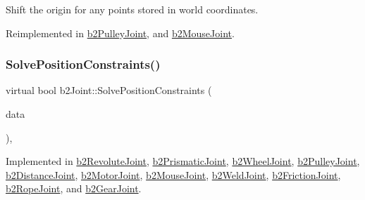 Shift the origin for any points stored in world coordinates. 



Reimplemented in \mbox{\hyperlink{classb2_pulley_joint_a5a9e626c758380fe565837bedb3dc018}{b2\+Pulley\+Joint}}, and \mbox{\hyperlink{classb2_mouse_joint_a9b1b2671837495be175e496afb622904}{b2\+Mouse\+Joint}}.

\mbox{\label{classb2_joint_af767ac9aa494bd15cdf83dfe3e487d9c}} 
\subsubsection{\texorpdfstring{SolvePositionConstraints()}{SolvePositionConstraints()}}
{\footnotesize\ttfamily virtual bool b2\+Joint\+::\+Solve\+Position\+Constraints (\begin{DoxyParamCaption}\item[{const \mbox{\hyperlink{structb2_solver_data}{b2\+Solver\+Data}} \&}]{data }\end{DoxyParamCaption})\hspace{0.3cm}{\ttfamily [protected]}, {}}



Implemented in \mbox{\hyperlink{classb2_revolute_joint_a01cab9d9609926a6debcd457bb8068f2}{b2\+Revolute\+Joint}}, \mbox{\hyperlink{classb2_prismatic_joint_ac841608a56e83f709e08b805ed8c92e3}{b2\+Prismatic\+Joint}}, \mbox{\hyperlink{classb2_wheel_joint_addbe70ee831954312bc31dee1d52311f}{b2\+Wheel\+Joint}}, \mbox{\hyperlink{classb2_pulley_joint_ac3d5f78f3bdd248ca368add8f21b7e95}{b2\+Pulley\+Joint}}, \mbox{\hyperlink{classb2_distance_joint_a431d12fac5ee9f6a5637321ee28119bc}{b2\+Distance\+Joint}}, \mbox{\hyperlink{classb2_motor_joint_a4e56455ab7e90f82fc1f463efc9b59de}{b2\+Motor\+Joint}}, \mbox{\hyperlink{classb2_mouse_joint_a13f9ec996eff59c15e6330a8c3f5ba9f}{b2\+Mouse\+Joint}}, \mbox{\hyperlink{classb2_weld_joint_a068ae45ce6577e27669121032c277015}{b2\+Weld\+Joint}}, \mbox{\hyperlink{classb2_friction_joint_a4e4b64b634299136bc2c7096d5c28aa8}{b2\+Friction\+Joint}}, \mbox{\hyperlink{classb2_rope_joint_a2fcbda6d472c660aa01793c798a8f92e}{b2\+Rope\+Joint}}, and \mbox{\hyperlink{classb2_gear_joint_a85633bbab3c4b4cb862bccce7e0253c2}{b2\+Gear\+Joint}}.

\mbox{\label{classb2_joint_ad302c8d02efcfe934158de0dc429348d}} 
